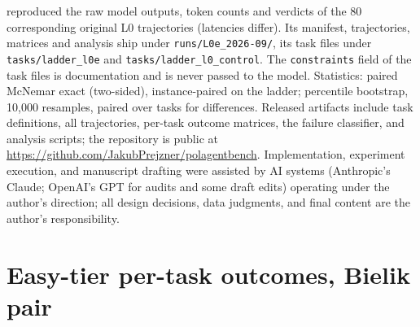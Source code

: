 \documentclass[11pt]{article}
\begin{document}
\begin{sloppypar}
reproduced the raw model outputs, token counts and verdicts of the 80 corresponding original L0 trajectories (latencies differ). Its manifest, trajectories, matrices and analysis ship under \texttt{runs/L0e\_2026-09/}, its task files under \texttt{tasks/ladder\_l0e} and \texttt{tasks/ladder\_l0\_control}. The \texttt{constraints} field of the task files is documentation and is never passed to the model. Statistics: paired McNemar exact (two-sided), instance-paired on the ladder; percentile bootstrap, 10{,}000 resamples, paired over tasks for differences. Released artifacts include task definitions, all trajectories, per-task outcome matrices, the failure classifier, and analysis scripts; the repository is public at \url{https://github.com/JakubPrejzner/polagentbench}. Implementation, experiment execution, and manuscript drafting were assisted by AI systems (Anthropic's Claude; OpenAI's GPT for audits and some draft edits) operating under the author's direction; all design decisions, data judgments, and final content are the author's responsibility.
\end{sloppypar}

\appendix

\FloatBarrier
\Needspace*{0.45\textheight}
\section{Easy-tier per-task outcomes, Bielik pair}
\label{app:easy}
\end{document}
